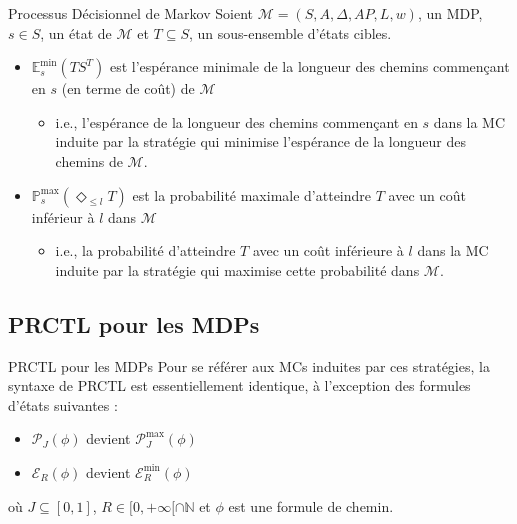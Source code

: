 \documentclass[compress]{beamer}
\begin{document}
\begin{frame}{Processus Décisionnel de Markov}
    Soient $\mathcal{M} = (S, A, \Delta, AP, L, w)$, un MDP, $s \in S$, un état
    de $\mathcal{M}$ et $T \subseteq S$, un sous-ensemble d'états cibles.
\begin{itemize}
  \item {\color{fibeamer@orange}$\mathbb{E}_s^{\min}(TS^T)$ est l'espérance minimale de la longueur des chemins commençant en $s$ (en terme de coût) de $\mathcal{M}$}
  \begin{itemize}
    \item i.e., l'espérance de la longueur des chemins commençant en $s$ dans la MC induite par la stratégie qui minimise l'espérance de la longueur des chemins de $\mathcal{M}$.
  \end{itemize}
  \item {\color{fibeamer@orange}$\mathbb{P}_s^{\max}(\Diamond_{\leq l} T)$ est la probabilité maximale d'atteindre $T$ avec un coût inférieur à $l$ dans $\mathcal{M}$}
  \begin{itemize}
    \item i.e., la probabilité d'atteindre $T$ avec un coût inférieure à $l$ dans la MC induite par la stratégie qui maximise cette probabilité dans $\mathcal{M}$.
  \end{itemize}
\end{itemize}
\end{frame}

\subsection{PRCTL pour les MDPs}
\begin{frame}{PRCTL pour les MDPs}
  Pour se référer aux MCs induites par ces stratégies, la syntaxe de PRCTL est essentiellement identique, à l'exception des formules d'états suivantes :
  \begin{itemize}
    \item $\mathcal{P}_J(\phi)$ devient $\mathcal{P}_J^{\max}(\phi)$
    \item $\mathcal{E}_R(\phi)$ devient $\mathcal{E}_R^{\min}(\phi)$
  \end{itemize}
    où $J \subseteq [0, 1]$, $R \in [0, +\infty[ \cap \mathbb{N}$ et $\phi$ est une formule de chemin.
\end{frame}
\end{document}
